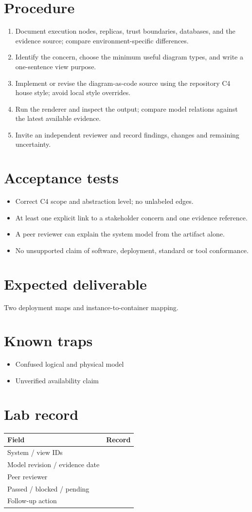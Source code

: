 \documentclass[10pt,letterpaper]{article}
\begin{document}
\section{Procedure}
\begin{enumerate}
\item Document execution nodes, replicas, trust boundaries, databases, and the evidence source; compare environment-specific differences.
\item Identify the concern, choose the minimum useful diagram types, and write a one-sentence view purpose.
\item Implement or revise the diagram-as-code source using the repository C4 house style; avoid local style overrides.
\item Run the renderer and inspect the output; compare model relations against the latest available evidence.
\item Invite an independent reviewer and record findings, changes and remaining uncertainty.
\end{enumerate}

\section{Acceptance tests}
\begin{itemize}
\item Correct C4 scope and abstraction level; no unlabeled edges.
\item At least one explicit link to a stakeholder concern and one evidence reference.
\item A peer reviewer can explain the system model from the artifact alone.
\item No unsupported claim of software, deployment, standard or tool conformance.
\end{itemize}

\section{Expected deliverable}
Two deployment maps and instance-to-container mapping.


\section{Known traps}
\begin{itemize}
\item Confused logical and physical model
\item Unverified availability claim
\end{itemize}

\section{Lab record}
\begin{tabularx}{\linewidth}{@{}YY@{}}\toprule
\textbf{Field} & \textbf{Record} \\ \midrule
System / view IDs &  \\
Model revision / evidence date &  \\
Peer reviewer &  \\
Passed / blocked / pending &  \\
Follow-up action &  \\
\bottomrule\end{tabularx}
\end{document}
